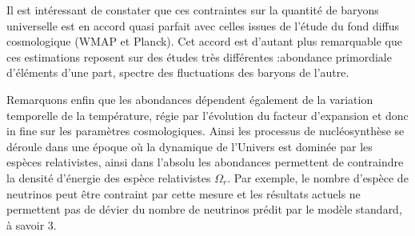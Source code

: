 Il est intéressant de constater que ces contraintes sur la quantité de baryons universelle est en accord quasi parfait avec celles issues de l'étude du fond diffus cosmologique (WMAP et Planck). Cet accord est d'autant plus remarquable que ces estimations reposent sur des études très différentes :abondance primordiale d'éléments d'une part, spectre des fluctuations des baryons de l'autre.

Remarquons enfin que les abondances dépendent également de la variation temporelle de la température, régie par l'évolution du facteur d'expansion et donc in fine sur les paramètres cosmologiques. Ainsi les processus de nucléosynthèse se déroule dans une époque où la dynamique de l'Univers est dominée par les espèces relativistes, ainsi dans l'absolu les abondances permettent de contraindre la densité d'énergie des espèce relativistes $\Omega_r$. Par exemple, le nombre d'espèce de neutrinos peut être contraint par cette mesure et les résultats actuels ne permettent pas de dévier du nombre de neutrinos prédit par le modèle standard, à savoir 3.

